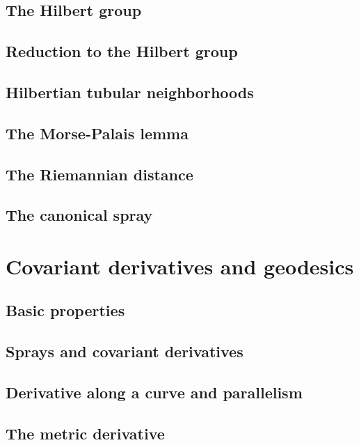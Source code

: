 \documentclass[a4paper]{article}
\begin{document}
\subsection{The Hilbert group}

\subsection{Reduction to the Hilbert group}

\subsection{Hilbertian tubular neighborhoods}

\subsection{The Morse-Palais lemma}

\subsection{The Riemannian distance}

\subsection{The canonical spray}

\section{Covariant derivatives and geodesics}

\subsection{Basic properties}

\subsection{Sprays and covariant derivatives}

\subsection{Derivative along a curve and parallelism}

\subsection{The metric derivative}
\end{document}
